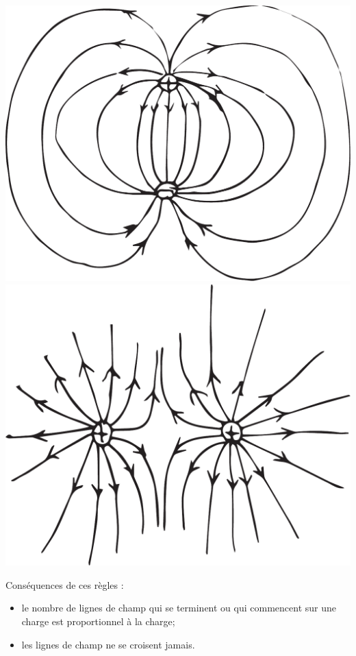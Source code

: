   \begin{center}
      \includegraphics[scale=0.2]{02-champ-electrique/figures/lignes-champ-dipole.pdf}
      \includegraphics[scale=0.2]{02-champ-electrique/figures/lignes-champ-deux-plus.pdf}
  \end{center}

  Conséquences de ces règles :

  \begin{itemize}
    \item le nombre de lignes de champ qui se terminent ou qui commencent sur une
      charge est proportionnel à la charge;
    \item les lignes de champ ne se croisent jamais.
  \end{itemize}


